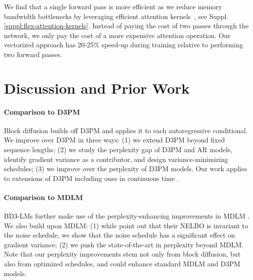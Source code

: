 \documentclass{article} %
\newcommand{\vkl}[1]{\textcolor{blue}{[VK: #1]}}
\def\algos{BD3-LMs}
\begin{document}
We find that a single forward pass is more efficient as we reduce memory bandwidth bottlenecks by leveraging efficient attention kernels~\citep{dao2022flashattention, dong2024flex}, see Suppl. \ref{suppl:flex-attention-kernels}. Instead of paying the cost of two passes through the network, we only pay the cost of a more expensive attention operation. Our vectorized approach has 20-25\% speed-up during training relative to performing two forward passes.


\section{Discussion and Prior Work}


\paragraph{Comparison to D3PM}
Block diffusion builds off D3PM \citep{austin2021structured} and applies it to each autoregressive conditional. We improve over D3PM in three ways: (1) we extend D3PM beyond fixed sequence lengths; (2) we study the perplexity gap of D3PM and AR models, identify gradient variance as a contributor, and design variance-minimizing schedules; (3) we improve over the perplexity of D3PM models. 
Our work applies to extensions of D3PM \citep{he2022diffusionbert,lou2024discrete} including ones in continuous time \citep{campbell2022continuous,sun2022score}.


\paragraph{Comparison to MDLM}
\algos{} further make use of the perplexity-enhancing improvements in MDLM \citep{sahoo2024simple,shi2024simplified,ou2025your}. We also build upon MDLM: (1) while \citet{sahoo2024simple} point out that their NELBO is invariant to the noise schedule, we show that the noise schedule has a significant effect on gradient variance; (2) we push the state-of-the-art in perplexity beyond MDLM. Note that our perplexity improvements stem not only from block diffusion, but also from optimized schedules, and could enhance standard MDLM and D3PM models.
\end{document}
